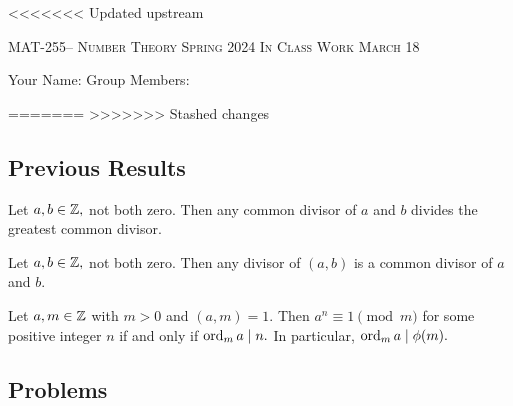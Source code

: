 \documentclass[handout]{ximera}
\date{March 18, 2024}
\date{\classday, 2024}
\begin{document}
\handoutAbstract
\maketitle
<<<<<<< Updated upstream
 	\begin{center}%
    		{\large \scshape MAT-255-- Number Theory 
			\hfill Spring 2024 
			\hfill In Class Work March 18}%
    
		{\large Your Name: \hrulefill \quad 
			Group Members:\hrulefill \quad 
			\hrulefill
			\par}%
 	\end{center}%
=======
>>>>>>> Stashed changes
	
 \subsection*{Previous Results}
 \begin{lemma}\label{lem:gcd_mult}
	Let $a,b\in\mathbb Z,$ not both zero. Then any  common divisor of $a$ and $b$ divides the greatest common divisor.
\end{lemma}


\begin{lemma}\label{lem:gcd_trans}
 	Let $a,b\in\mathbb Z,$ not both zero. Then any divisor of $(a,b)$ is a common divisor of $a$ and $b$.
\end{lemma}
 
 \begin{proposition}[Proposition 5.1]\label{prop:order_divides_phi}
    Let $a,m\in\mathbb Z$ with $m>0$ and $(a,m)=1.$ Then $a^n\equiv 1\pmod{m}$ for some positive integer $n$ if and only if $\operatorname{ord}_m a\mid n.$ In particular, $\operatorname{ord}_m a\mid \phi(m).$
\end{proposition}

\subsection*{Problems}
\end{document}
